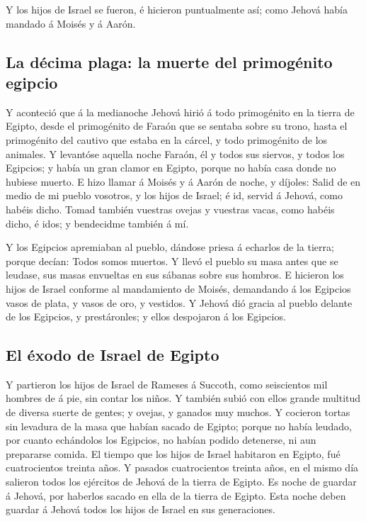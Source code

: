 Y los hijos de Israel se fueron, é hicieron puntualmente
así; como Jehová había mandado á Moisés y á Aarón.

\hypertarget{la-duxe9cima-plaga-la-muerte-del-primoguxe9nito-egipcio}{%
\subsection{La décima plaga: la muerte del primogénito
egipcio}\label{la-duxe9cima-plaga-la-muerte-del-primoguxe9nito-egipcio}}

 Y aconteció que á la medianoche Jehová hirió á todo
primogénito en la tierra de Egipto, desde el primogénito de Faraón que
se sentaba sobre su trono, hasta el primogénito del cautivo que estaba
en la cárcel, y todo primogénito de los animales.  Y
levantóse aquella noche Faraón, él y todos sus siervos, y todos los
Egipcios; y había un gran clamor en Egipto, porque no había casa donde
no hubiese muerto.  E hizo llamar á Moisés y á Aarón de
noche, y díjoles: Salid de en medio de mi pueblo vosotros, y los hijos
de Israel; é id, servid á Jehová, como habéis dicho.  Tomad
también vuestras ovejas y vuestras vacas, como habéis dicho, é idos; y
bendecidme también á mí.

 Y los Egipcios apremiaban al pueblo, dándose priesa á
echarlos de la tierra; porque decían: Todos somos muertos. 
Y llevó el pueblo su masa antes que se leudase, sus masas envueltas en
sus sábanas sobre sus hombros.  E hicieron los hijos de
Israel conforme al mandamiento de Moisés, demandando á los Egipcios
vasos de plata, y vasos de oro, y vestidos.  Y Jehová dió
gracia al pueblo delante de los Egipcios, y prestáronles; y ellos
despojaron á los Egipcios.

\hypertarget{el-uxe9xodo-de-israel-de-egipto}{%
\subsection{El éxodo de Israel de
Egipto}\label{el-uxe9xodo-de-israel-de-egipto}}

 Y partieron los hijos de Israel de Rameses á Succoth, como
seiscientos mil hombres de á pie, sin contar los niños.  Y
también subió con ellos grande multitud de diversa suerte de gentes; y
ovejas, y ganados muy muchos.  Y cocieron tortas sin
levadura de la masa que habían sacado de Egipto; porque no había
leudado, por cuanto echándolos los Egipcios, no habían podido detenerse,
ni aun prepararse comida.  El tiempo que los hijos de
Israel habitaron en Egipto, fué cuatrocientos treinta años.
 Y pasados cuatrocientos treinta años, en el mismo día
salieron todos los ejércitos de Jehová de la tierra de Egipto.
 Es noche de guardar á Jehová, por haberlos sacado en ella
de la tierra de Egipto. Esta noche deben guardar á Jehová todos los
hijos de Israel en sus generaciones.


